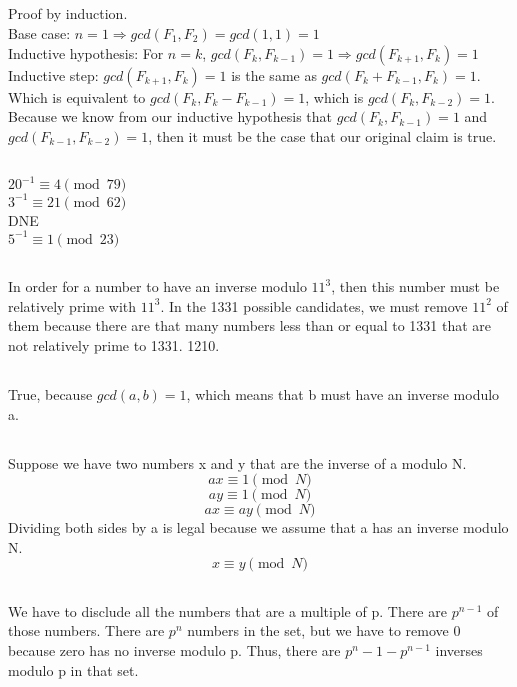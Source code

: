 \documentclass{article}
\begin{document}
\subsection{}Proof by induction.\\ 
Base case: $n=1 \Rightarrow gcd(F_1,F_2)=gcd(1,1)=1$\\
Inductive hypothesis: For $n=k$, $gcd(F_k,F_{k-1})=1 \Rightarrow gcd(F_{k+1},F_k)=1$
Inductive step: $gcd(F_{k+1},F_k)=1$ is the same as $gcd(F_k+F_{k-1},F_k)=1$. Which is equivalent to $gcd(F_k,F_k-F_{k-1})=1$, which is $gcd(F_k,F_{k-2})=1$. Because we know from our inductive hypothesis that $gcd(F_k,F_{k-1})=1$ and $gcd(F_{k-1},F_{k-2})=1$, then it must be the case that our original claim is true. 
\subsection{}$20^{-1} \equiv 4 \pmod{79}$\\
$3^{-1} \equiv 21 \pmod{62}$\\
DNE\\
$5^{-1} \equiv 1 \pmod{23}$
\subsection{}
In order for a number to have an inverse modulo $11^3$, then this number must be relatively prime with $11^3$. In the 1331 possible candidates, we must remove $11^2$ of them because there are that many numbers less than or equal to 1331 that are not relatively prime to 1331. 1210. 
\subsection{}True, because $gcd(a,b)=1$, which means that b must have an inverse modulo a.
\subsection{}Suppose we have two numbers x and y that are the inverse of a modulo N. 
$$ax \equiv 1\pmod N$$
$$ay \equiv 1\pmod N$$
$$ax \equiv ay\pmod N$$
Dividing both sides by a is legal because we assume that a has an inverse modulo N.
$$x \equiv y \pmod N$$
\subsection{}We have to disclude all the numbers that are a multiple of p. There are $p^{n-1}$ of those numbers. There are $p^n$ numbers in the set, but we have to remove $0$ because zero has no inverse modulo p. Thus, there are $p^n-1-p^{n-1}$ inverses modulo p in that set. 
\end{document}
